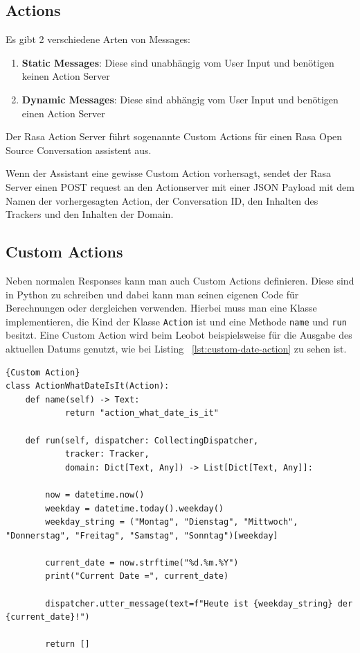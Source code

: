 \subsection{Actions}

Es gibt 2 verschiedene Arten von Messages:

\begin{enumerate}
    \item \textbf{Static Messages}: Diese sind unabhängig vom User Input und benötigen keinen Action Server\cite{actionsVid}
    \item \textbf{Dynamic Messages}: Diese sind abhängig vom User Input und benötigen einen Action Server\cite{actionsVid}
\end{enumerate}

Der Rasa Action Server führt sogenannte Custom Actions für einen Rasa Open Source Conversation assistent aus.

Wenn der Assistant eine gewisse Custom Action vorhersagt, sendet der Rasa Server einen POST request an den Actionserver mit einer JSON Payload mit dem Namen der vorhergesagten Action, der Conversation ID, den Inhalten des Trackers und den Inhalten der Domain.\cite{actions}

\subsection{Custom Actions}

Neben normalen Responses kann man auch Custom Actions definieren.
Diese sind in Python zu schreiben und dabei kann man seinen eigenen Code für Berechnungen oder dergleichen verwenden.
Hierbei muss man eine Klasse implementieren, die Kind der Klasse \texttt{Action} ist und eine Methode \texttt{name} und \texttt{run} besitzt.
Eine Custom Action wird beim Leobot beispielsweise für die Ausgabe des aktuellen Datums genutzt, wie bei Listing ~\ref{lst:custom-date-action} zu sehen ist.

\begin{lstlisting}[label={lst:custom-date-action},caption={Custom Action für die Ausgabe des aktuellen Datums}]{Custom Action}
class ActionWhatDateIsIt(Action):
    def name(self) -> Text:
            return "action_what_date_is_it"

    def run(self, dispatcher: CollectingDispatcher,
            tracker: Tracker,
            domain: Dict[Text, Any]) -> List[Dict[Text, Any]]:

        now = datetime.now()
        weekday = datetime.today().weekday()
        weekday_string = ("Montag", "Dienstag", "Mittwoch", "Donnerstag", "Freitag", "Samstag", "Sonntag")[weekday]

        current_date = now.strftime("%d.%m.%Y")
        print("Current Date =", current_date)

        dispatcher.utter_message(text=f"Heute ist {weekday_string} der {current_date}!")

        return []
\end{lstlisting}

